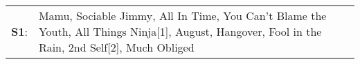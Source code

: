 \begin{supertabular}{p{0.03\textwidth}p{0.92\textwidth}}
 \textbf{S1}:  &  Mamu\textsuperscript{}, \enspace Sociable Jimmy\textsuperscript{}, \enspace All In Time\textsuperscript{}, \enspace You Can't Blame the Youth\textsuperscript{}, \enspace All Things Ninja[1]\textsuperscript{}, \enspace August\textsuperscript{}, \enspace Hangover\textsuperscript{}, \enspace Fool in the Rain\textsuperscript{}, \enspace 2nd Self[2]\textsuperscript{}, \enspace Much Obliged\textsuperscript{}  \enspace  \\
\end{supertabular}
